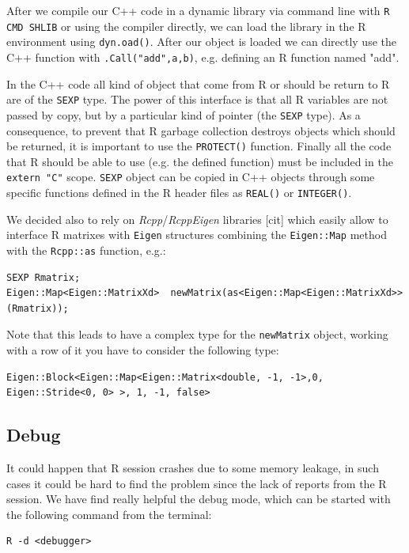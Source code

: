 After we compile our C++ code in a dynamic library via command line with \verb|R CMD SHLIB| or using the compiler directly, we can load the library in the R environment using \verb|dyn.oad()|. After our object is loaded we can directly use the C++ function with \verb|.Call("add",a,b)|, e.g. defining an R function named "add".

In the C++ code all kind of object that come from R or should be return to R are of the \verb|SEXP| type. The power of this interface is that all R variables are not passed by copy, but by a particular kind of pointer (the \verb|SEXP| type). As a consequence, to prevent that R garbage collection destroys objects which should be returned, it is important to use the \verb|PROTECT()| function. Finally all the code that R should be able to use (e.g. the defined function) must be included in the \verb|extern "C"| scope. \verb|SEXP| object can be copied in C++ objects through some specific functions defined in the R header files as \verb|REAL()| or \verb|INTEGER()|. 
 
\medskip

We decided also to rely on \emph{Rcpp}/\emph{RcppEigen} libraries [cit] which easily allow to interface R matrixes with \verb|Eigen| structures combining the \verb|Eigen::Map| method with the \verb|Rcpp::as| function, e.g.:

\begin{lstlisting}
SEXP Rmatrix;
Eigen::Map<Eigen::MatrixXd>  newMatrix(as<Eigen::Map<Eigen::MatrixXd>> (Rmatrix));
\end{lstlisting}

Note that this leads to have a complex type for the \verb|newMatrix| object, working with a row of it you have to consider the following type:

\begin{lstlisting}
Eigen::Block<Eigen::Map<Eigen::Matrix<double, -1, -1>,0, Eigen::Stride<0, 0> >, 1, -1, false>
\end{lstlisting}

\subsection{Debug}
It could happen that R session crashes due to some memory leakage, in such cases it could be hard to find the problem since the lack of reports from the R session. We have find really helpful the debug mode, which can be started with the following command from the terminal:

\begin{lstlisting}
R -d <debugger>
\end{lstlisting}

